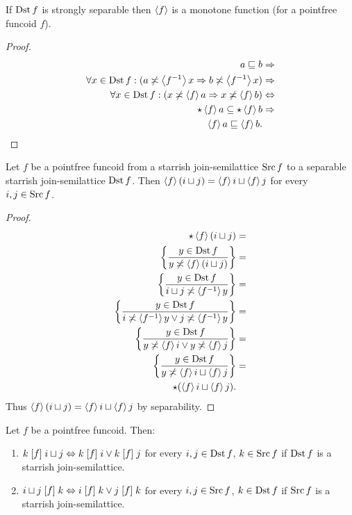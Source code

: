 \begin{prop}
\label{pfcd-mono}If $\Dst f$ is strongly separable then
$\supfun f$ is a monotone function (for a pointfree funcoid $f$).\end{prop}
\begin{proof}
~
\begin{align*}
a\sqsubseteq b & \Rightarrow\\
\forall x\in\Dst f:(a\nasymp\supfun{f^{-1}}x\Rightarrow b\nasymp\supfun{f^{-1}}x) & \Rightarrow\\
\forall x\in\Dst f:(x\nasymp\supfun fa\Rightarrow x\nasymp\supfun fb) & \Leftrightarrow\\
\fullstar\supfun fa\subseteq\fullstar\supfun fb & \Rightarrow\\
\supfun fa\sqsubseteq\supfun fb.
\end{align*}
\end{proof}
\begin{thm}
\label{pf-dist-func}Let $f$ be a pointfree funcoid from a starrish
join-semilattice $\Src f$ to a separable starrish join-semilattice
$\Dst f$. Then $\supfun f(i\sqcup j)=\supfun fi\sqcup\supfun fj$
for every $i,j\in\Src f$.\end{thm}
\begin{proof}
~
\begin{align*}
\fullstar\supfun f(i\sqcup j) & =\\
\setcond{y\in\Dst f}{y\nasymp\supfun f(i\sqcup j)} & =\\
\setcond{y\in\Dst f}{i\sqcup j\nasymp\supfun{f^{-1}}y} & =\\
\setcond{y\in\Dst f}{i\nasymp\supfun{f^{-1}}y\lor j\nasymp\supfun{f^{-1}}y} & =\\
\setcond{y\in\Dst f}{y\nasymp\supfun fi\lor y\nasymp\supfun fj} & =\\
\setcond{y\in\Dst f}{y\nasymp\supfun fi\sqcup\supfun fj} & =\\
\fullstar(\supfun fi\sqcup\supfun fj).
\end{align*}
Thus $\supfun f(i\sqcup j)=\supfun fi\sqcup\supfun fj$ by separability.\end{proof}
\begin{prop}
\label{pf-join-arg}Let $f$ be a pointfree funcoid. Then:\end{prop}
\begin{enumerate}
\item \label{pf-f-join-y}$k\suprel fi\sqcup j\Leftrightarrow k\suprel fi\lor k\suprel fj$
for every $i,j\in\Dst f$, $k\in\Src f$ if $\Dst f$ is a starrish
join-semilattice.
\item \label{pf-f-join-x}$i\sqcup j\suprel fk\Leftrightarrow i\suprel fk\lor j\suprel fk$
for every $i,j\in\Src f$, $k\in\Dst f$ if $\Src f$ is a starrish
join-semilattice.\end{enumerate}
